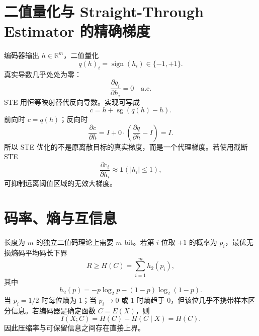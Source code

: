 \documentclass[UTF8,12pt,a4paper,fontset=none]{ctexart}
\numberwithin{equation}{section}
\newcommand{\R}{\mathbb{R}}
\newcommand{\sg}{\operatorname{sg}}
\begin{document}
\section{二值量化与 Straight-Through Estimator 的精确梯度}
编码器输出 $h\in\R^m$，二值量化
\begin{equation}
 q(h)_i=\operatorname{sign}(h_i)\in\{-1,+1\}.
\end{equation}
真实导数几乎处处为零：
\begin{equation}
 \frac{\partial q_i}{\partial h_i}=0\quad\text{a.e.}
\end{equation}
STE 用恒等映射替代反向导数。实现可写成
\begin{equation}
 c=h+\sg(q(h)-h).
\end{equation}
前向时 $c=q(h)$；反向时
\begin{equation}
 \frac{\partial c}{\partial h}
 =I+0\cdot\left(\frac{\partial q}{\partial h}-I\right)=I.
\end{equation}
所以 STE 优化的不是原离散目标的真实梯度，而是一个代理梯度。若使用截断 STE
\begin{equation}
 \frac{\partial c_i}{\partial h_i}\approx\mathbf1(|h_i|\le1),
\end{equation}
可抑制远离阈值区域的无效大梯度。

\section{码率、熵与互信息}
长度为 $m$ 的独立二值码理论上需要 $m$ bit。若第 $i$ 位取 $+1$ 的概率为 $p_i$，最优无损熵码平均码长下界
\begin{equation}
 R\ge H(C)=\sum_{i=1}^{m}h_2(p_i),
\end{equation}
其中
\begin{equation}
 h_2(p)=-p\log_2p-(1-p)\log_2(1-p).
\end{equation}
当 $p_i=1/2$ 时每位熵为 1；当 $p_i\to0$ 或 $1$ 时熵趋于 0，但该位几乎不携带样本区分信息。若编码器是确定函数 $C=E(X)$，则
\begin{equation}
 I(X;C)=H(C)-H(C\mid X)=H(C).
\end{equation}
因此压缩率与可保留信息之间存在直接上界。
\end{document}
